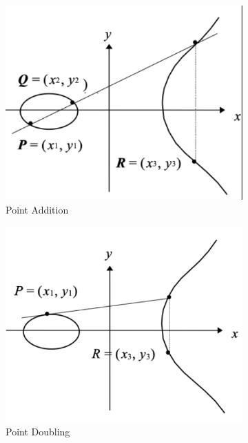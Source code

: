 \begin{figure}[h!]
    \centering    
    \begin{subfigure}[b]{0.3\textwidth}
        \includegraphics[width=\linewidth]{img/ecadd.png}
        \caption{Point Addition}
    \end{subfigure}
    \hfill
    \begin{subfigure}[b]{0.3\textwidth}
        \includegraphics[width=\linewidth]{img/pointdoubling.png}
        \caption{Point Doubling}
    \end{subfigure}
    \hfill
    \begin{subfigure}[b]{0.3\textwidth}

\end{subfigure}
\end{figure}
